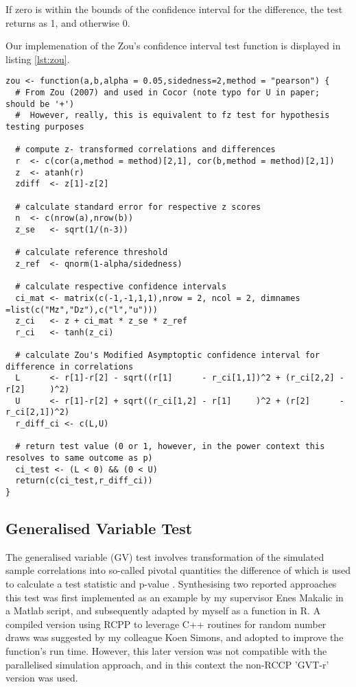 If zero is within the bounds of the confidence interval for the difference, the test returns as 1, and otherwise 0.

Our implemenation of the Zou's confidence interval test function is displayed in listing \ref{lst:zou}.

\begin{lstlisting}[float=h,caption={Zou's confidence interval},label={lst:zou}]
zou <- function(a,b,alpha = 0.05,sidedness=2,method = "pearson") {
  # From Zou (2007) and used in Cocor (note typo for U in paper; should be '+')
  #  However, really, this is equivalent to fz test for hypothesis testing purposes
  
  # compute z- transformed correlations and differences
  r  <- c(cor(a,method = method)[2,1], cor(b,method = method)[2,1])
  z  <- atanh(r)
  zdiff  <- z[1]-z[2]
  
  # calculate standard error for respective z scores
  n  <- c(nrow(a),nrow(b))
  z_se   <- sqrt(1/(n-3))

  # calculate reference threshold
  z_ref  <- qnorm(1-alpha/sidedness)
  
  # calculate respective confidence intervals
  ci_mat <- matrix(c(-1,-1,1,1),nrow = 2, ncol = 2, dimnames =list(c("Mz","Dz"),c("l","u")))
  z_ci   <- z + ci_mat * z_se * z_ref
  r_ci   <- tanh(z_ci)
  
  # calculate Zou's Modified Asymptoptic confidence interval for difference in correlations
  L      <- r[1]-r[2] - sqrt((r[1]      - r_ci[1,1])^2 + (r_ci[2,2] - r[2]     )^2)
  U      <- r[1]-r[2] + sqrt((r_ci[1,2] - r[1]     )^2 + (r[2]      - r_ci[2,1])^2)
  r_diff_ci <- c(L,U)
  
  # return test value (0 or 1, however, in the power context this resolves to same outcome as p)
  ci_test <- (L < 0) && (0 < U)
  return(c(ci_test,r_diff_ci))
}
\end{lstlisting}



\subsection{Generalised Variable Test}

The generalised variable (GV) test involves transformation of the simulated sample correlations into so-called pivotal quantities the difference of which is used to calculate a test statistic and p-value \cite{Krishnamoorthy2014}. Synthesising two reported approaches \cite{Krishnamoorthy2007,Kazemi2016} this test was first implemented as an example by my supervisor Enes Makalic in a Matlab script, and subsequently adapted by myself as a function in R.  A compiled version using RCPP to leverage C++ routines for random number draws was suggested by my colleague Koen Simons, and adopted to improve the function's run time. However, this later version was not compatible with the parallelised simulation approach, and in this context the non-RCCP 'GVT-r' version was used.

